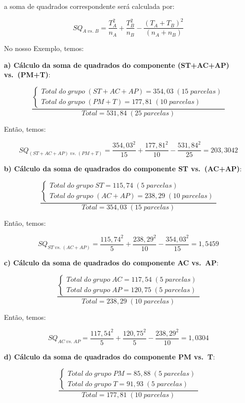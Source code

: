 \documentclass[
]{book}
\begin{document}
a soma de quadrados correspondente será calculada por:

\[
SQ_{A\;vs.\;B}=\frac{T_A^2}{n_A}+\frac{T_B^2}{n_B}-\frac{(T_A+T_B)^2}{(n_A+n_B)}
\]

No nosso Exemplo, temos:

\textbf{a) Cálculo da soma de quadrados do componente (ST+AC+AP) vs.~(PM+T)}:

\[
\frac{\begin{cases} 
Total\;do\;grupo\;(ST+AC+AP)=354,03\;(15\;parcelas)  \\ 
Total\;do\;grupo\;(PM+T)=177,81\;(10\;parcelas)  \end{cases}}
{Total=531,84\;(25\;parcelas)}
\]

Então, temos:

\[
SQ_{(ST+AC+AP)\;vs.\;(PM+T)}=\frac{354,03^2}{15}+\frac{177,81^2}{10}-\frac{531,84^2}{25}=203,3042
\]

\textbf{b) Cálculo da soma de quadrados do componente ST vs.~(AC+AP)}:

\[
\frac{\begin{cases} 
Total\;do\;grupo\;ST=115,74\;(5\;parcelas)  \\ 
Total\;do\;grupo\;(AC+AP)=238,29\;(10\;parcelas)  \end{cases}}
{Total=354,03\;(15\;parcelas)}
\]

Então, temos:

\[
SQ_{ST\;vs.\;(AC+AP)}=\frac{115,74^2}{5}+\frac{238,29^2}{10}-\frac{354,03^2}{15}=1,5459
\]

\textbf{c) Cálculo da soma de quadrados do componente AC vs.~AP}:

\[
\frac{\begin{cases} 
Total\;do\;grupo\;AC=117,54\;(5\;parcelas)  \\ 
Total\;do\;grupo\;AP=120,75\;(5\;parcelas)  \end{cases}}
{Total=238,29\;(10\;parcelas)}
\]

Então, temos:

\[
SQ_{AC\;vs.\;AP}=\frac{117,54^2}{5}+\frac{120,75^2}{5}-\frac{238,29^2}{10}=1,0304
\]

\textbf{d) Cálculo da soma de quadrados do componente PM vs.~T}:

\[
\frac{\begin{cases} 
Total\;do\;grupo\;PM=85,88\;(5\;parcelas)  \\ 
Total\;do\;grupo\;T=91,93\;(5\;parcelas)  \end{cases}}
{Total=177,81\;(10\;parcelas)}
\]
\end{document}
